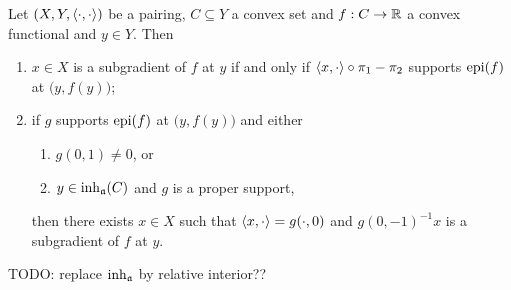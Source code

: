 \begin{lemma} \label{subgradientEpigraphSupport}
Let $\sSet{X,Y,\pair{\cdot,\cdot}}$ be a pairing, $C\subseteq Y$ a convex set and $f: C\to \mathbb{R}$ a convex functional and $y\in Y$. Then
\begin{enumerate}
\item $x\in X$ is a subgradient of $f$ at $y$ \textup{if and only if} $\left\langle x, \cdot \right\rangle\circ \pi_1 - \pi_2$ supports $\operatorname{epi}(f)$ at $\big(y, f(y)\big)$;
\item if $g$ supports $\operatorname{epi}(f)$ at $\big(y, f(y)\big)$ and either
\begin{enumerate}
\item $g(0,1)\neq 0$, or
\item $y\in \operatorname{inh}_\mathfrak{a}(C)$ and $g$ is a proper support,
\end{enumerate}
then there exists $x\in X$ such that $\left\langle x,\cdot \right\rangle = g(\cdot,0)$ and $g(0,-1)^{-1}x$ is a subgradient of $f$ at $y$. 
\end{enumerate}
\end{lemma}
TODO: replace $\operatorname{inh}_\mathfrak{a}$ by relative interior??
